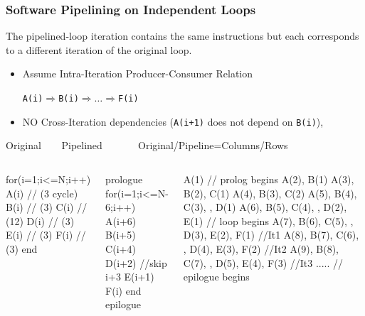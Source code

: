 \documentclass{beamer}
\renewcommand{\emph}[1]{\textcolor{structure}{#1}}
\newcommand{\emp}[1]{\textcolor{DikuRed}{ #1}}
\begin{document}
\begin{frame}[fragile,t]
    \frametitle{Software Pipelining on Independent Loops}

The pipelined-loop iteration contains the same instructions 
but each corresponds to a different iteration of the original loop.

\begin{scriptsize}
\begin{itemize}
\item Assume Intra-Iteration Producer-Consumer Relation 
\begin{scriptsize}{\tt A(i)$\Rightarrow$B(i)$\Rightarrow\ldots \Rightarrow$F(i)}\end{scriptsize}
\item NO Cross-Iteration dependencies ({\tt A(i+1)} does not depend on {\tt B(i)}),
\end{itemize}
\end{scriptsize}


\begin{block}{Original{\tt~~~~}Pipelined{\tt~~~~~~~}Original/Pipeline=Columns/Rows}\vspace{-2ex}
\begin{columns}
\begin{colorcode}[fontsize=\tiny]
for(i=1;i<=N;i++)
  A(i) // (3 cycle)
  B(i) // (3)
  C(i) // (12)
  D(i) // (3)
  E(i) // (3)
  F(i) // (3)
end
\end{colorcode}
\begin{colorcode}[fontsize=\tiny]
prologue
for(i=1;i<=N-6;i++)
  A(i+6)
  B(i+5)
  C(i+4)
  D(i+2) //\alert{skip i+3}
  E(i+1)
  F(i)
end
epilogue
\end{colorcode}
\pause
\begin{colorcode}[fontsize=\tiny]
\emp{A(1)}                                      // \emp{prolog begins}
\emp{A(2), B(1)} 
\emp{A(3), B(2), C(1)} 
\emp{A(4), B(3), C(2)} 
\emp{A(5), B(4), C(3),     , D(1)}
\emp{A(6), B(5), C(4),     , D(2), E(1)} // \emph{loop begins}
\emph{A(7), B(6), C(5),     , D(3), E(2), F(1)   //It1}
\emph{A(8), B(7), C(6),     , D(4), E(3), F(2)   //It2}
\emph{A(9), B(8), C(7),     , D(5), E(4), F(3)   //It3}
\emp{.....                                     // epilogue begins} 
\end{colorcode}
\end{columns}
\end{block}
\smallskip



\end{frame}
\end{document}
